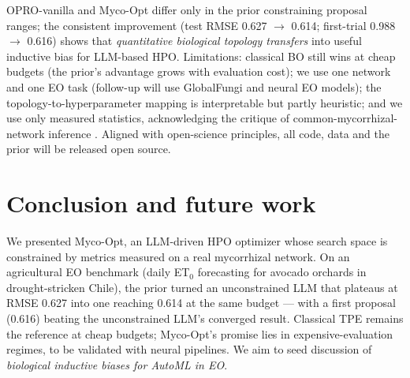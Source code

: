 \documentclass[11pt]{article}
\begin{document}
OPRO-vanilla and Myco-Opt differ only in the prior constraining proposal
ranges; the consistent improvement (test RMSE 0.627 $\rightarrow$ 0.614;
first-trial 0.988 $\rightarrow$ 0.616) shows that \emph{quantitative
biological topology transfers} into useful inductive bias for LLM-based HPO.
Limitations: classical BO still wins at cheap budgets (the prior's advantage
grows with evaluation cost); we use one network and one EO task (follow-up will
use GlobalFungi \citep{vetrovsky2020} and neural EO models); the
topology-to-hyperparameter mapping is interpretable but partly heuristic; and
we use only measured statistics, acknowledging the critique of
common-mycorrhizal-network inference \citep{karst2023}. Aligned with open-science
principles, all code, data and the prior will be released
open source.

\section{Conclusion and future work}
\label{sec:conclusion}

We presented Myco-Opt, an LLM-driven HPO optimizer whose search space is
constrained by metrics measured on a real mycorrhizal network. On an
agricultural EO benchmark (daily ET$_0$ forecasting for avocado orchards in
drought-stricken Chile), the prior turned an unconstrained LLM that plateaus at
RMSE 0.627 into one reaching 0.614 at the same budget --- with a first proposal
(0.616) beating the unconstrained LLM's converged result. Classical TPE remains
the reference at cheap budgets; Myco-Opt's promise lies in expensive-evaluation
regimes, to be validated with neural pipelines. We aim to seed discussion of
\emph{biological inductive biases for AutoML in EO}.


\end{document}
